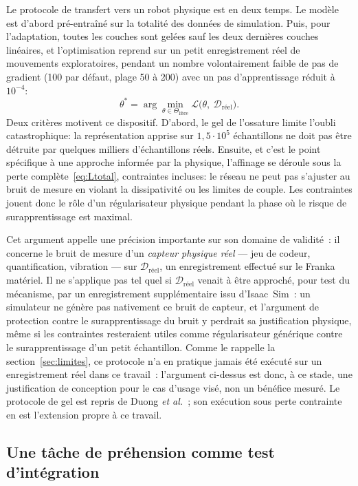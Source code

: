 \documentclass[a4paper, oneside]{article}
\begin{document}
Le protocole de transfert vers un robot physique est en deux temps. Le modèle
est d'abord pré-entraîné sur la totalité des données de simulation. Puis, pour
l'adaptation, toutes les couches sont gelées sauf les deux dernières couches
linéaires, et l'optimisation reprend sur un petit enregistrement réel de
mouvements exploratoires, pendant un nombre volontairement faible de pas de
gradient (100 par défaut, plage 50 à 200) avec un pas d'apprentissage réduit à
$10^{-4}$:
%
\begin{equation}
    \theta^{*} = \arg\min_{\theta \in \Theta_{\mathrm{libre}}}
    \mathcal{L}\bigl(\theta,\ \mathcal{D}_{\text{réel}}\bigr) .
    \label{eq:finetune}
\end{equation}
%
Deux critères motivent ce dispositif. D'abord, le gel de l'ossature limite
l'oubli catastrophique: la représentation apprise sur $1{,}5\cdot 10^{5}$
échantillons ne doit pas être détruite par quelques milliers d'échantillons
réels. Ensuite, et c'est le point spécifique à une approche informée par la
physique, l'affinage se déroule sous la perte complète~\eqref{eq:Ltotal},
contraintes incluses: le réseau ne peut pas s'ajuster au bruit de mesure en
violant la dissipativité ou les limites de couple. Les contraintes jouent donc
le rôle d'un régularisateur physique pendant la phase où le risque de
surapprentissage est maximal.

Cet argument appelle une précision importante sur son domaine de validité~:
il concerne le bruit de mesure d'un \emph{capteur physique réel} — jeu de
codeur, quantification, vibration — sur $\mathcal{D}_{\text{réel}}$, un
enregistrement effectué sur le Franka matériel. Il ne s'applique pas tel quel
si $\mathcal{D}_{\text{réel}}$ venait à être approché, pour test du
mécanisme, par un enregistrement supplémentaire issu d'Isaac~Sim~: un
simulateur ne génère pas nativement ce bruit de capteur, et l'argument de
protection contre le surapprentissage du bruit y perdrait sa justification
physique, même si les contraintes resteraient utiles comme régularisateur
générique contre le surapprentissage d'un petit échantillon. Comme le rappelle
la section~\ref{sec:limites}, ce protocole n'a en pratique jamais été exécuté
sur un enregistrement réel dans ce travail~: l'argument ci-dessus est donc, à
ce stade, une justification de conception pour le cas d'usage visé, non un
bénéfice mesuré. Le protocole de gel est repris de
Duong \emph{et al.}~\cite{duong2024}; son exécution sous perte contrainte en
est l'extension propre à ce travail.

\subsection{Une tâche de préhension comme test d'intégration}
\label{sec:tache}
\end{document}
